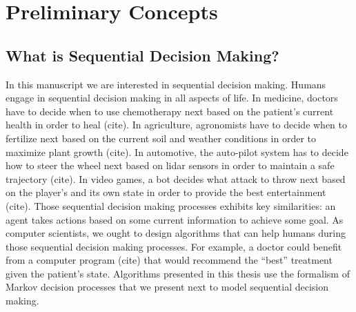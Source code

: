 \chapter*{Preliminary Concepts}

\section{What is Sequential Decision Making?}
In this manuscript we are interested in sequential decision making. Humans engage in sequential decision making in all aspects of life. In medicine, doctors have to decide when to use chemotherapy next based on the patient's current health in order to heal (cite). In agriculture, agronomists have to decide when to fertilize next based on the current soil and weather conditions in order to maximize plant growth (cite). In automotive, the auto-pilot system has to decide how to steer the wheel next based on lidar sensors in order to maintain a safe trajectory (cite). In video games, a bot decides what attack to throw next based on the player's and its own state in order to provide the best entertainment (cite).
Those sequential decision making processes exhibits key similarities: an agent takes actions based on some current information to achieve some goal.
As computer scientists, we ought to design algorithms that can help humans during those sequential decision making processes. For example, a doctor could benefit from a computer program (cite) that would recommend the ``best'' treatment given the patient's state. 
Algorithms presented in this thesis use the formalism of Markov decision processes that we present next to model sequential decision making.
